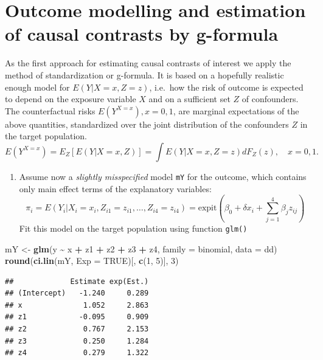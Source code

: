 \documentclass[
]{book}
\newenvironment{Shaded}{\begin{snugshade}}{\end{snugshade}}
\newcommand{\AttributeTok}[1]{\textcolor[rgb]{0.13,0.29,0.53}{#1}}
\newcommand{\ConstantTok}[1]{\textcolor[rgb]{0.56,0.35,0.01}{#1}}
\newcommand{\DecValTok}[1]{\textcolor[rgb]{0.00,0.00,0.81}{#1}}
\newcommand{\FunctionTok}[1]{\textcolor[rgb]{0.13,0.29,0.53}{\textbf{#1}}}
\newcommand{\NormalTok}[1]{#1}
\newcommand{\OtherTok}[1]{\textcolor[rgb]{0.56,0.35,0.01}{#1}}
\newcommand{\SpecialCharTok}[1]{\textcolor[rgb]{0.81,0.36,0.00}{\textbf{#1}}}
\providecommand{\tightlist}{%
  \setlength{\itemsep}{0pt}\setlength{\parskip}{0pt}}
\begin{document}
\section{Outcome modelling and estimation of causal contrasts by g-formula}\label{outcome-modelling-and-estimation-of-causal-contrasts-by-g-formula}

As the first approach for estimating causal contrasts of interest we
apply the method of standardization or g-formula. It is based on a
hopefully realistic enough model for \(E(Y|X=x, Z=z)\), i.e.~how the risk
of outcome is expected to depend on the exposure variable \(X\) and on a
sufficient set \(Z\) of confounders. The counterfactual risks
\(E(Y^{X=x}), x=0,1\), are marginal expectations of the above quantities,
standardized over the joint distribution of the confounders \(Z\) in the
target population. \[ E(Y^{X=x}) = E_Z[E(Y|X=x,Z)]
       = \int E(Y|X=x, Z=z)dF_Z(z), \quad x=0,1. \]

\begin{enumerate}
\def\labelenumi{\arabic{enumi}.}
\tightlist
\item
  Assume now a \emph{slightly misspecified} model \texttt{mY} for the outcome,
  which contains only main effect terms of the explanatory variables:
  \[ \pi_i = E(Y_i|X_i=x_i, Z_{i1}=z_{i1}, \dots, Z_{i4}=z_{i4}) =
    \text{expit}\left(\beta_0 + \delta x_i +
    \sum_{j=1}^4 \beta_j z_{ij} \right) \] Fit this model on the
  target population using function \texttt{glm()}
\end{enumerate}

\begin{Shaded}
\begin{Highlighting}[]
\NormalTok{mY }\OtherTok{\textless{}{-}} \FunctionTok{glm}\NormalTok{(y }\SpecialCharTok{\textasciitilde{}}\NormalTok{ x }\SpecialCharTok{+}\NormalTok{ z1 }\SpecialCharTok{+}\NormalTok{ z2 }\SpecialCharTok{+}\NormalTok{ z3 }\SpecialCharTok{+}\NormalTok{ z4, }\AttributeTok{family =}\NormalTok{ binomial, }\AttributeTok{data =}\NormalTok{ dd)}
\FunctionTok{round}\NormalTok{(}\FunctionTok{ci.lin}\NormalTok{(mY, }\AttributeTok{Exp =} \ConstantTok{TRUE}\NormalTok{)[, }\FunctionTok{c}\NormalTok{(}\DecValTok{1}\NormalTok{, }\DecValTok{5}\NormalTok{)], }\DecValTok{3}\NormalTok{)}
\end{Highlighting}
\end{Shaded}

\begin{verbatim}
##             Estimate exp(Est.)
## (Intercept)   -1.240     0.289
## x              1.052     2.863
## z1            -0.095     0.909
## z2             0.767     2.153
## z3             0.250     1.284
## z4             0.279     1.322
\end{verbatim}
\end{document}
